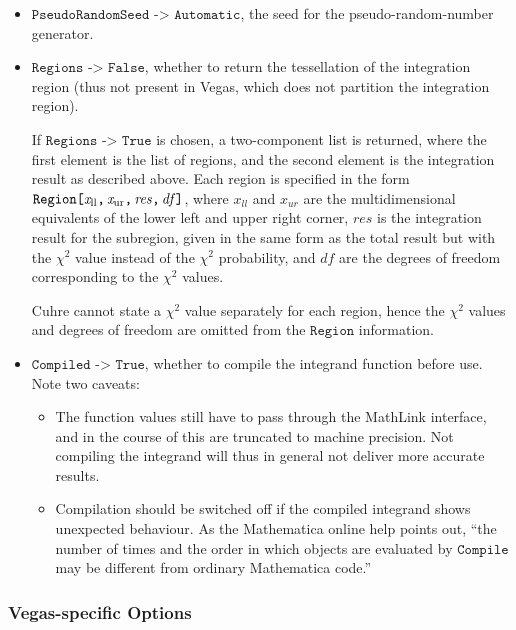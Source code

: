 \documentclass[12pt]{article}
\newcommand\Code[1]{\ensuremath{\texttt{#1}}}
\newcommand\Var[1]{\ensuremath{\mathit{#1}}}
\newcommand\Option[2]{\item\Code{#1 -> #2},}
\begin{document}
\begin{itemize}
\Option{PseudoRandomSeed}{Automatic}
the seed for the pseudo-random-number generator.

\Option{Regions}{False}
whether to return the tessellation of the integration region (thus not
present in Vegas, which does not partition the integration region).

If \Code{Regions -> True} is chosen, a two-component list is returned,
where the first element is the list of regions, and the second element
is the integration result as described above.  Each region is specified
in the form \Code{Region[\Var{x_{\mathrm{ll}}},\,\Var{x_{\mathrm{ur}}},%
\,\Var{res},\,\Var{df}]}, where \Var{x_{\text{ll}}} and
\Var{x_{\text{ur}}} are the multidimensional equivalents of the lower
left and upper right corner, \Var{res} is the integration result for the
subregion, given in the same form as the total result but with the
$\chi^2$ value instead of the $\chi^2$ probability, and \Var{df} are the
degrees of freedom corresponding to the $\chi^2$ values. 

Cuhre cannot state a $\chi^2$ value separately for each region, hence
the $\chi^2$ values and degrees of freedom are omitted from the
\Code{Region} information.

\Option{Compiled}{True}
whether to compile the integrand function before use.  Note two caveats:
\begin{itemize}
\item
The function values still have to pass through the MathLink interface,
and in the course of this are truncated to machine precision.  Not
compiling the integrand will thus in general not deliver more accurate
results.
\item
Compilation should be switched off if the compiled integrand shows
unexpected behaviour.  As the Mathematica online help points out, ``the
number of times and the order in which objects are evaluated by
\Code{Compile} may be different from ordinary Mathematica code.''
\end{itemize}
\end{itemize}


\subsubsection{Vegas-specific Options}
\end{document}
